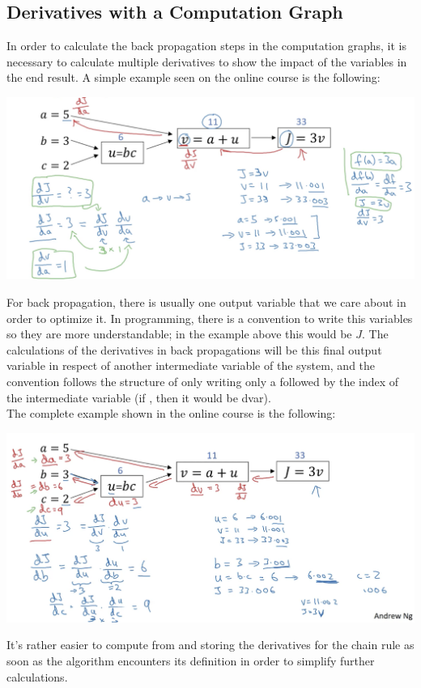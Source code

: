 \documentclass[11pt]{report}
\begin{document}
\subsection{Derivatives with a Computation Graph}
In order to calculate the back propagation steps in the computation graphs, it is necessary to calculate multiple derivatives to show the impact of the variables in the end result. A simple example seen on the online course is the following:
\begin{center}
    \includegraphics[width = .75\textwidth]{BPG.png}
\end{center}
For back propagation, there is usually one output variable that we care about in order to optimize it. In programming, there is a convention to write this variables so they are more understandable; in the example above this would be $J$. The calculations of the derivatives in back propagations will be this final output variable in respect of another intermediate variable of the system, and the convention follows the structure of only writing only a  followed by the index of the intermediate variable (if , then it would be dvar).\\
\newpage
The complete example shown in the online course is the following:
\begin{center}
    \includegraphics[width = .75\textwidth]{CBPG.png}
\end{center}
It's rather easier to compute from  and storing the derivatives for the chain rule as soon as the algorithm encounters its definition in order to simplify further calculations.
\end{document}
